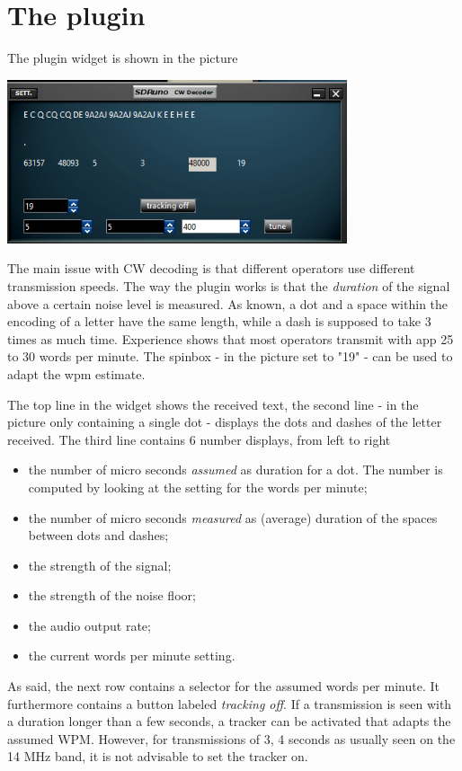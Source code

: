 \documentclass[11pt]{article}
\begin{document}
\section{The plugin}
The plugin widget  is shown in the picture

\includegraphics[width=100mm]{cw-plugin-widget.png}

The main issue with CW decoding is that different operators use different
transmission speeds.
The way the plugin works is that the {\em duration} of the signal above
a certain noise level is measured. As known, a dot and a space within the
encoding of a letter have the same length, while a dash is supposed to take 3 times as much time.
Experience shows that most operators transmit with app 25 to 30 words per
minute. The spinbox - in the picture set to "19" - can be used to adapt 
the wpm estimate.

The top line in the widget shows the received text,
the second line - in the picture only containing a single dot -
displays the dots and dashes of the letter received.
The third line contains 6 number displays, from left to right
\begin{itemize}
\item the number of micro seconds {\em assumed} as duration for a dot. The 
number is computed by looking at the setting for the words per minute;
\item the number of micro seconds {\em measured} as (average) duration of
the spaces between dots and dashes;
\item the strength of the signal;
\item the strength of the noise floor;
\item the audio output rate; 
\item the current words per minute setting.
\end{itemize}

As said, the next row contains a selector for the assumed words per minute.
It furthermore contains a button labeled {\em tracking off}. If a transmission
is seen with a duration longer than a few seconds, a tracker can be activated
that adapts the assumed WPM. However, for transmissions of 3, 4 seconds
as usually seen on the 14 MHz band, it is not advisable to set the tracker on.
\end{document}
